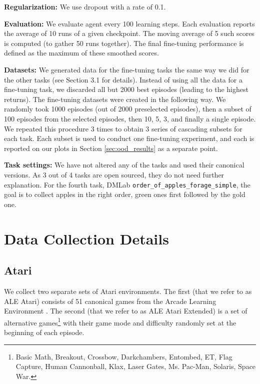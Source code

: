 \documentclass[10pt]{article} \usepackage[accepted]{tmlr}
\newcommand{\atari}{{ALE Atari}}
\newcommand{\ataritwo}{{ALE Atari Extended}}
\begin{document}
\noindent \textbf{Regularization:}
We use dropout \citep{srivastava14adropout} with a rate of 0.1.

\noindent \textbf{Evaluation:} We evaluate agent every 100 learning steps. Each evaluation reports the average of 10 runs of a given checkpoint.
The moving average of 5 such scores is computed (to gather 50 runs together).
The final fine-tuning performance is defined as the maximum of these smoothed scores.

\noindent \textbf{Datasets:} We generated data for the fine-tuning tasks the same way we did for the other tasks (see Section 3.1 for details). Instead of using all the data for a fine-tuning task, we discarded all but 2000 best episodes (leading to the highest returns). The fine-tuning datasets were created in the following way. We randomly took 1000 episodes (out of 2000 preselected episodes), then a subset of 100 episodes from the selected episodes, then 10, 5, 3, and finally a single episode. We repeated this procedure 3 times to obtain 3 series of cascading subsets for each task. Each subset is used to conduct one fine-tuning experiment, and each is reported on our plots in Section \ref{sec:ood_results} as a separate point.

\noindent \textbf{Task settings:} We have not altered any of the tasks and used their canonical versions. As 3 out of 4 tasks are open sourced, they do not need further explanation. For the fourth task, DMLab \texttt{order\_of\_apples\_forage\_simple}, the goal is to collect apples in the right order, green ones first followed by the gold one.

\section{Data Collection Details}
\label{sec:data-collection}
\subsection{Atari}
\label{sec:atari_details}
\vskip 0.2cm
We collect two separate sets of Atari environments.
The first (that we refer to as \atari{}) consists of 51 canonical games from the Arcade Learning Environment \citep{bellemare2013arcade}.
The second (that we refer to as \ataritwo{}) is a set of alternative
games\footnote{Basic Math, Breakout, Crossbow, Darkchambers, Entombed, ET, Flag Capture, Human Cannonball, Klax, Laser Gates, Ms. Pac-Man, Solaris, Space War.}
with their game mode and difficulty randomly set at the beginning of each episode.
\end{document}
